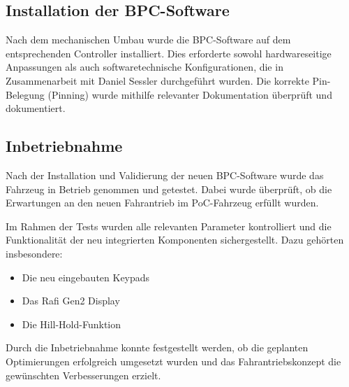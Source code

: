 \documentclass[a4paper, 12pt]{article} %
\begin{document}
\begin{spacing}{1.5}
 \subsection{Installation der BPC-Software}
Nach dem mechanischen Umbau wurde die \acs{BPC}-Software auf 
dem entsprechenden Controller installiert. Dies erforderte sowohl hardwareseitige Anpassungen
 als auch softwaretechnische Konfigurationen, die in Zusammenarbeit mit Daniel Sessler durchgeführt wurden. 
 Die korrekte Pin-Belegung (Pinning) wurde mithilfe relevanter Dokumentation überprüft und dokumentiert.

\subsection{Inbetriebnahme}
Nach der Installation und Validierung der neuen \acs{BPC}-Software wurde das Fahrzeug in Betrieb genommen und getestet. Dabei wurde überprüft, 
ob die Erwartungen an den neuen Fahrantrieb im \acs{PoC}-Fahrzeug erfüllt wurden.

Im Rahmen der Tests wurden alle relevanten Parameter kontrolliert und 
die Funktionalität der neu integrierten Komponenten sichergestellt. Dazu gehörten insbesondere:

\begin{itemize}
    \item Die neu eingebauten Keypads
    \item Das Rafi Gen2 Display
    \item Die Hill-Hold-Funktion
\end{itemize}

Durch die Inbetriebnahme konnte festgestellt werden, 
ob die geplanten Optimierungen erfolgreich umgesetzt wurden und das Fahrantriebskonzept 
die gewünschten Verbesserungen erzielt.
\end{spacing}
\end{document}
